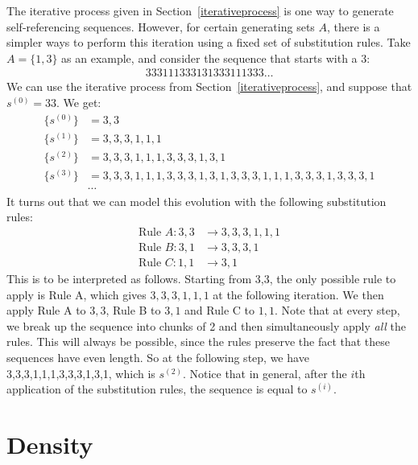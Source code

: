 \documentclass[runningheads,a4paper]{llncs}
\begin{document}
The iterative process given in Section~\ref{iterativeprocess} is one way to generate self-referencing sequences. However, for certain generating sets $A$, there is a simpler ways to perform this iteration using a fixed set of substitution rules. Take $A = \{1,3\}$ as an example, and consider the sequence that starts with a 3:
\begin{align*}
333111333131333111333\dots
\end{align*}
We can use the iterative process from Section~\ref{iterativeprocess}, and suppose that $s^{(0)} = 33$. We get:
\begin{align*}
\{s^{(0)}\} &= 3,3\\
\{s^{(1)}\} &= 3,3,3,1,1,1\\
\{s^{(2)}\} &= 3,3,3,1,1,1,3,3,3,1,3,1\\
\{s^{(3)}\} &= 3,3,3,1,1,1,3,3,3,1,3,1,3,3,3,1,1,1,3,3,3,1,3,3,3,1\\
&\cdots
\end{align*}
It turns out that we can model this evolution with the following substitution rules:
\begin{align*}
\text{Rule }A: 3,3 &\to 3,3,3,1,1,1 \\
\text{Rule }B: 3,1 &\to 3,3,3,1\\
\text{Rule }C: 1,1 &\to 3,1
\end{align*}
This is to be interpreted as follows. Starting from 3,3, the only possible rule to apply is Rule A, which gives $3,3,3,1,1,1$ at the following iteration. We then apply Rule A to $3,3$, Rule B to $3,1$ and Rule C to $1,1$. Note that at every step, we break up the sequence into chunks of 2 and then simultaneously apply \emph{all} the rules. This will always be possible, since the rules preserve the fact that these sequences have even length. So at the following step, we have 3,3,3,1,1,1,3,3,3,1,3,1, which is $s^{(2)}$. Notice that in general, after the $i$th application of the substitution rules, the sequence is equal to $s^{(i)}$.




\section{Density}
\label{density}
\end{document}
